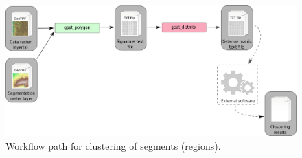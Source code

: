 \documentclass[12pt,margin=0.5in]{article}
\begin{document}
\begin{figure}[H]
	\centering
	\includegraphics[width=\textwidth]{cluster_seg_scheme.png}
	\caption{Workflow path for clustering of segments (regions).}
	\label{FIG:CLUSTER_SEGMENT}
\end{figure}

\FloatBarrier
\end{document}
